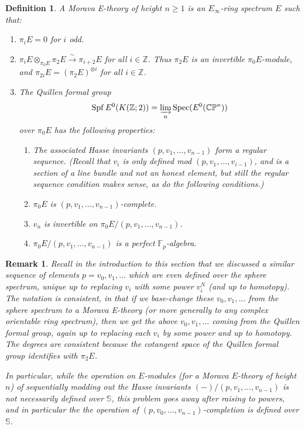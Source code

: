 \documentclass[12pt]{article}
\newtheorem{definition}[theorem]{Definition}
\newtheorem{remark}[theorem]{Remark}
\newcommand{\on}{\operatorname}
\begin{document}
\begin{definition}
A \emph{Morava E-theory of height $n\geq 1$} is an $E_\infty$-ring spectrum $E$ such that:
\begin{enumerate}
\item $\pi_iE=0$ for $i$ odd.
\item $\pi_iE\otimes_{\pi_0E}\pi_2E \overset{\sim}{\to}\pi_{i+2}E$ for all $i\in\mathbb{Z}$.  Thus $\pi_2 E$ is an invertible $\pi_0E$-module, and  $\pi_{2i}E = (\pi_2E)^{\otimes i}$ for all $i\in\mathbb{Z}$.
\item The Quillen formal group
$$\on{Spf}E^0(K(\mathbb{Z};2))=\varinjlim_n \on{Spec}(E^0(\mathbb{C}\mathbb{P}^n))$$
over $\pi_0 E$ has the following properties:
\begin{enumerate}
\item The associated Hasse invariants $(p,v_1,\ldots,v_{n-1})$ form a regular sequence.  (Recall that $v_i$ is only defined mod $(p,v_1,\ldots,v_{i-1})$, and is a section of a line bundle and not an honest element, but still the regular sequence condition makes sense, as do the following conditions.)
\item $\pi_0E$ is $(p,v_1,\ldots,v_{n-1})$-complete.
\item $v_n$ is invertible on $\pi_0E/(p,v_1,\ldots,v_{n-1})$.
\item $\pi_0E/(p,v_1,\ldots,v_{n-1})$ is a perfect $\mathbb{F}_p$-algebra.
\end{enumerate}
\end{enumerate}
\end{definition}

\begin{remark}
Recall in the introduction to this section that we discussed a similar sequence of elements $p=v_0,v_1,\ldots$ which are even defined over the sphere spectrum, unique up to replacing $v_i$ with some power $v_i^N$ (and up to homotopy).  The notation is consistent, in that if we base-change these $v_0,v_1,\ldots$ from the sphere spectrum to a Morava E-theory (or more generally to any complex orientable ring spectrum), then we get the above $v_0,v_1,\ldots$ coming from the Quillen formal group, again up to replacing each $v_i$ by some power and up to homotopy.  The degrees are consistent because the cotangent space of the Quillen formal group identifies with $\pi_2 E$.

In particular, while the operation on $E$-modules (for a Morava $E$-theory of height $n$) of sequentially modding out the Hasse invariants $(-)/(p,v_1,\ldots,v_{n-1})$ is not necessarily defined over $\mathbb{S}$, this problem goes away after raising to powers, and in particular the the operation of $(p,v_0,\ldots,v_{n-1})$-completion is defined over $\mathbb{S}$.
\end{remark}
\end{document}
